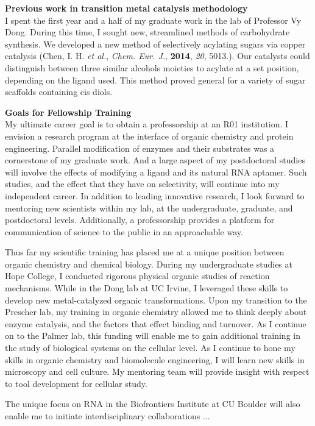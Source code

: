 \documentclass[11pt]{article}
\begin{document}
\textbf{Previous work in transition metal catalysis methodology}\\ %
I spent the first year and a half of my graduate work in the lab of Professor Vy Dong. During this time, I sought new, streamlined methods of carbohydrate synthesis. We developed a new method of selectively acylating sugars via copper catalysis (Chen, I. H. \textit{et al.}, \textit{Chem. Eur. J.}, \textbf{2014}, \textit{20}, 5013.). Our catalysts could distinguish between three similar alcohols moieties to acylate at a set position, depending on the ligand used. This method proved general for a variety of sugar scaffolds containing cis diols.

\textbf{Goals for Fellowship Training}\\
My ultimate career goal is to obtain a professorship at an R01 institution. I envision a research program at the interface of organic chemistry and protein engineering. Parallel modification of enzymes and their substrates was a cornerstone of my graduate work. And a large aspect of my postdoctoral studies will involve the effects of modifying a ligand and its natural RNA aptamer. Such studies, and the effect that they have on selectivity, will continue into my independent career. In addition to leading innovative research, I look forward to mentoring new scientists within my lab, at the undergraduate, graduate, and postdoctoral levels. Additionally, a professorship provides a platform for communication of science to the public in an approachable way.

Thus far my scientific training has placed me at a unique position between organic chemistry and chemical biology. During my undergraduate studies at Hope College, I conducted rigorous physical organic studies of reaction mechanisms. While in the Dong lab at UC Irvine, I leveraged these skills to develop new metal-catalyzed organic transformations. Upon my transition to the Prescher lab, my training in organic chemistry allowed me to think deeply about enzyme catalysis, and the factors that effect binding and turnover. As I continue on to the Palmer lab, this funding will enable me to gain additional training in the study of biological systems on the cellular level. As I continue to hone my skills in organic chemistry and biomolecule engineering, I will learn new skills in microscopy and cell culture. My mentoring team will provide insight with respect to tool development for cellular study.

The unique focus on RNA in the Biofrontiers Institute at CU Boulder will also enable me to initiate interdisciplinary collaborations ... %
\end{document}
